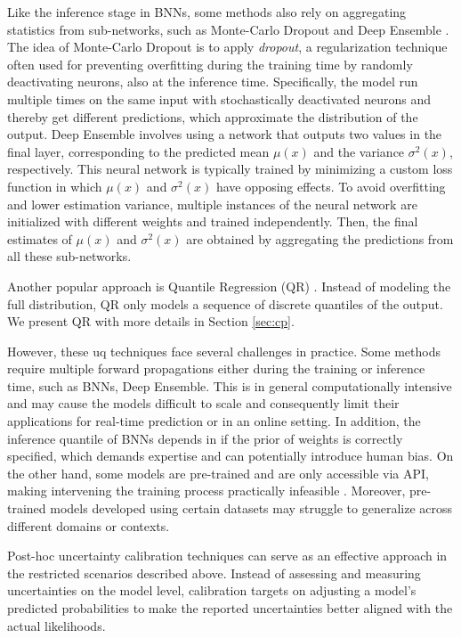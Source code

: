 \documentclass[a4paper,oneside,bibliography=totoc]{scrbook}
\begin{document}
Like the inference stage in BNNs, some methods also rely on aggregating statistics from sub-networks, such as Monte-Carlo Dropout \cite{gal2016dropout} and Deep Ensemble \cite{lakshminarayanan2017simple}. The idea of Monte-Carlo Dropout is to apply \textit{dropout}, a regularization technique often used for preventing overfitting during the training time by randomly deactivating neurons, also at the inference time. Specifically, the model run multiple times on the same input with stochastically deactivated neurons and thereby get  different predictions, which approximate the distribution of the output. Deep Ensemble involves using a network that outputs two values in the final layer, corresponding to the predicted mean $\mu(x)$ and the variance $\sigma^2(x)$, respectively. This neural network is typically trained by minimizing a custom loss function in which $\mu(x)$ and $\sigma^2(x)$ have opposing effects. To avoid overfitting and lower estimation variance, multiple instances of the neural network are initialized with different weights and trained independently. Then, the final estimates of $\mu(x)$ and $\sigma^2(x)$ are obtained by aggregating the predictions from all these sub-networks. 

Another popular approach is Quantile Regression (QR) \cite{koenker1978regression}. Instead of modeling the full distribution, QR only models a sequence of discrete quantiles of the output. We present QR with more details in Section \ref{sec:cp}. 

However, these \gls{uq} techniques face several challenges in practice. Some methods require multiple forward propagations either during the training or inference time, such as BNNs, Deep Ensemble. This is in general computationally intensive and may cause the models difficult to scale and consequently limit their applications for real-time prediction or in an online setting. In addition, the inference quantile of BNNs depends in if the prior of weights is correctly specified, which demands expertise and can potentially introduce human bias. On the other hand, some models are pre-trained and are only accessible via API, making intervening the training process practically infeasible \cite{mossina2024CVPR}. Moreover, pre-trained models developed using certain datasets may struggle to generalize across different domains or contexts. 

\vspace{0.5cm}

Post-hoc uncertainty calibration techniques can serve as an effective approach in the restricted scenarios described above. Instead of assessing and measuring uncertainties on the model level, calibration targets on adjusting a model's predicted probabilities to make the reported uncertainties better aligned with the actual likelihoods.
\end{document}
